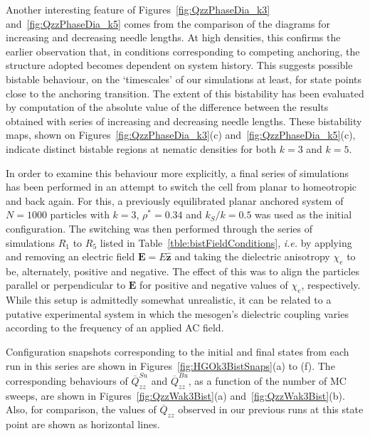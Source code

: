 \documentclass[aps,10pt,twocolumn]{revtex4}
\makeatletter
\newcommand{\vect}[1]{ \mathbf{#1} }
\newcommand{\vecth}[1]{ \mathbf{\hat{#1} } }
\newcommand{\ie}{\emph{i.e.}\@\xspace}
\makeatother
\begin{document}

Another interesting feature of Figures~\ref{fig:QzzPhaseDia_k3} and~\ref{fig:QzzPhaseDia_k5} comes from the
comparison of the diagrams for increasing and decreasing needle lengths. At high densities, this confirms the
earlier observation that, in conditions corresponding to competing  anchoring, the structure adopted becomes
dependent on system history. This suggests possible bistable behaviour, on the `timescales' of our simulations at
least, for state points close to the anchoring transition. The extent of this bistability has been evaluated by
computation of the absolute value of the difference between the results obtained with series of increasing and
decreasing needle lengths. These bistability maps, shown on Figures~\ref{fig:QzzPhaseDia_k3}(c)
and~\ref{fig:QzzPhaseDia_k5}(c), indicate distinct bistable regions at nematic densities for both $k=3$ and $k=5$.

In order to examine this behaviour more explicitly, a final series of simulations has been performed in an attempt
to switch the cell from planar to homeotropic and back again. For this, a previously equilibrated planar anchored
system of $N=1000$ particles with $k=3$, $\rho^{*}=0.34$ and $k_S/k = 0.5$ was used as the initial configuration.
The switching was then performed through the series of simulations $R_1$ to $R_5$ listed in
Table~\ref{tble:bistFieldConditions}, \ie by applying and removing an electric field $\vect{E} = E\vecth{z}$ and
taking the dielectric anisotropy $\chi_e$ to be, alternately, positive and negative. The effect of this was to
align the particles parallel or perpendicular to $\vect{E}$ for positive and negative values of $\chi_e$,
respectively. While this setup is admittedly somewhat unrealistic, it can be related to a putative experimental
system in which the mesogen's dielectric coupling varies according to the frequency of an applied AC field.

Configuration snapshots corresponding to the initial and final states from each run in this series are shown in
Figures~\ref{fig:HGOk3BistSnaps}(a) to (f). The corresponding behaviours of $\overline{Q}^{Su}_{zz}$ and
$\overline{Q}^{Bu}_{zz}$, as a function of the number of MC sweeps, are shown in Figures~\ref{fig:QzzWak3Bist}(a)
and~\ref{fig:QzzWak3Bist}(b). Also, for comparison, the values of $\overline{Q}_{zz}$ observed in our previous
runs at this state point are shown as horizontal lines.
\end{document}
